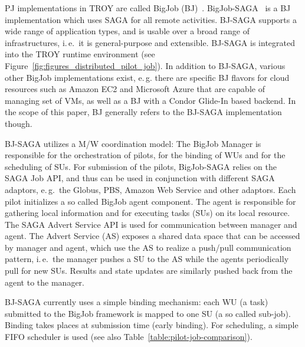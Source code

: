 \documentclass[conference,final]{IEEEtran}
\begin{document}


PJ implementations in TROY are called BigJob (BJ)~\cite{bigjob_web}.
BigJob-SAGA~\cite{saga_bigjob_condor_cloud} is a BJ implementation
which uses SAGA for all remote activities.  BJ-SAGA supports a wide
range of application types, and is usable over a broad range of
infrastructures, i.\,e.\ it is general-purpose and extensible. BJ-SAGA
is integrated into the TROY runtime environment 
(see Figure~\ref{fig:figures_distributed_pilot_job}).  In addition to
BJ-SAGA, various other BigJob implementations exist, e.\,g. there are
specific BJ flavors for cloud resources such as Amazon EC2 and
Microsoft Azure that are capable of managing set of VMs, as well as a
BJ with a Condor Glide-In based backend.  In the scope of this paper,
BJ generally refers to the BJ-SAGA implementation though.

BJ-SAGA utilizes a M/W coordination model: The BigJob Manager is responsible for
the orchestration of pilots, for the binding of WUs and for the scheduling of
SUs. For submission of the pilots, BigJob-SAGA relies on the SAGA Job API, and
thus can be used in conjunction with different SAGA adaptors, e.\,g.\ the
Globus, PBS, Amazon Web Service and other adaptors. Each pilot initializes a so
called BigJob agent component. The agent is responsible for gathering local
information and for executing tasks (SUs) on its local resource. The SAGA Advert
Service API is used for communication between manager and agent. The Advert
Service (AS) exposes a shared data space that can be accessed by manager and
agent, which use the AS to realize a push/pull communication pattern,
i.\,e.\ the manager pushes a SU to the AS while the agents periodically pull for
new SUs. Results and state updates are similarly pushed back from the agent to the manager.

BJ-SAGA currently uses a simple binding mechanism: each WU (a task)
submitted to the BigJob framework is mapped to one SU (a so called
sub-job).  Binding takes places at submission time (early binding).
For scheduling, a simple FIFO scheduler is used (see also
Table~\ref{table:pilot-job-comparison}).


\end{document}
